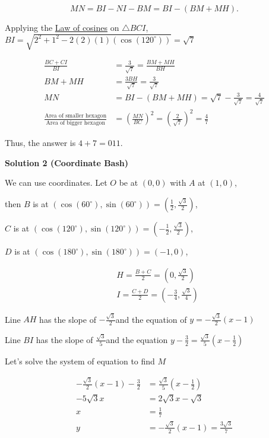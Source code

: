 \begin{enumerate}
 
 \[MN=BI-NI-BM=BI-(BM+MH).\]

 Applying the \href{https://artofproblemsolving.com/wiki/index.php?title=Law\_of\_cosines}{Law of cosines} on $\triangle BCI$, $BI=\sqrt{2^2+1^2-2(2)(1)(\cos(120^\circ))}=\sqrt{7}$

 \begin{align*}\frac{BC+CI}{BI}&=\frac{3}{\sqrt{7}}=\frac{BM+MH}{BH} \\ BM+MH&=\frac{3BH}{\sqrt{7}}=\frac{3}{\sqrt{7}} \\ MN&=BI-(BM+MH)=\sqrt{7}-\frac{3}{\sqrt{7}}=\frac{4}{\sqrt{7}} \\ \frac{\text{Area of smaller hexagon}}{\text{Area of bigger hexagon}}&=\left(\frac{MN}{BC}\right)^2=\left(\frac{2}{\sqrt{7}}\right)^2=\frac{4}{7}\end{align*}


 Thus, the answer is $4 + 7 = \boxed{011}.$




\textbf{Solution 2 (Coordinate Bash)}

We can use coordinates. Let $O$ be at $(0,0)$ with $A$ at $(1,0)$, 

 then $B$ is at $(\cos(60^\circ),\sin(60^\circ))=\left(\frac{1}{2},\frac{\sqrt{3}}{2}\right)$, 

 $C$ is at $(\cos(120^\circ),\sin(120^\circ))=\left(-\frac{1}{2},\frac{\sqrt{3}}{2}\right)$, 

 $D$ is at $(\cos(180^\circ),\sin(180^\circ))=(-1,0)$, 

 
 \begin{align*}&H=\frac{B+C}{2}=\left(0,\frac{\sqrt{3}}{2}\right) \\ &I=\frac{C+D}{2}=\left(-\frac{3}{4},\frac{\sqrt{3}}{4}\right)\end{align*}


 


 Line $AH$ has the slope of $-\frac{\sqrt{3}}{2}$and the equation of $y=-\frac{\sqrt{3}}{2}(x-1)$

 


 Line $BI$ has the slope of $\frac{\sqrt{3}}{5}$and the equation $y-\frac{3}{2}=\frac{\sqrt{3}}{5}\left(x-\frac{1}{2}\right)$

 
 

 Let's solve the system of equation to find $M$

 \begin{align*}-\frac{\sqrt{3}}{2}(x-1)-\frac{3}{2}&=\frac{\sqrt{3}}{5}\left(x-\frac{1}{2}\right) \\ -5\sqrt{3}x&=2\sqrt{3}x-\sqrt{3} \\ x&=\frac{1}{7} \\ y&=-\frac{\sqrt{3}}{2}(x-1)=\frac{3\sqrt{3}}{7}\end{align*}



\end{enumerate}

